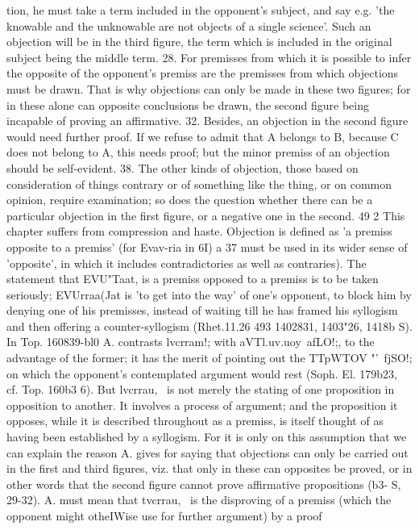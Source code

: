 {{{{{{{{{{{{{{{{{{{{{{{{{{{{{tion, he must take a term included in the opponent's subject, and
say e.g. 'the knowable and the unknowable are not objects of a
single science'. Such an objection will be in the third figure, the
term which is included in the original subject being the middle
term.
28. For premisses from which it is possible to infer the opposite
of the opponent's premiss are the premisses from which objections
must be drawn. That is why objections can only be made in these
two figures; for in these alone can opposite conclusions be drawn,
the second figure being incapable of proving an affirmative.
32. Besides, an objection in the second figure would need
further proof. If we refuse to admit that A belongs to B, because
C does not belong to A, this needs proof; but the minor premiss of
an objection should be self-evident.
38. The other kinds of objection, those based on consideration
of things contrary or of something like the thing, or on common
opinion, require examination; so does the question whether there
can be a particular objection in the first figure, or a negative one
in the second.
49 2
This chapter suffers from compression and haste. Objection is
defined as 'a premiss opposite to a premiss' (for Evav-ria in 6I) a 37
must be used in its wider sense of 'opposite', in which it includes
contradictories as well as contraries). The statement that
EVU"Taat, is a premiss opposed to a premiss is to be taken seriously;
EVUrraa(Jat is 'to get into the way' of one's opponent, to block him
by denying one of his premisses, instead of waiting till he has
framed his syllogism and then offering a counter-syllogism (Rhet.11.26
493
1402831, 1403"26, 1418b S). In Top. 160839-bl0 A. contrasts lvcrram!;
with aVTl.uv.uoy~afLO!;, to the advantage of the former; it has the
merit of pointing out the TTpWTOV "'~fjSO!; on which the opponent's
contemplated argument would rest (Soph. El. 179b23, cf. Top.
160b3 6).
But lvcrrau,~ is not merely the stating of one proposition in
opposition to another. It involves a process of argument; and
the proposition it opposes, while it is described throughout as
a premiss, is itself thought of as having been established by a
syllogism. For it is only on this assumption that we can explain
the reason A. gives for saying that objections can only be carried
out in the first and third figures, viz. that only in these can
opposites be proved, or in other words that the second figure
cannot prove affirmative propositions (b3- S, 29-32). A. must
mean that tvcrrau,~ is the disproving of a premiss (which the
opponent might otheIWise use for further argument) by a proof
}}}}}}}}}}}}}}}}}}}}}}}}}}}}}
